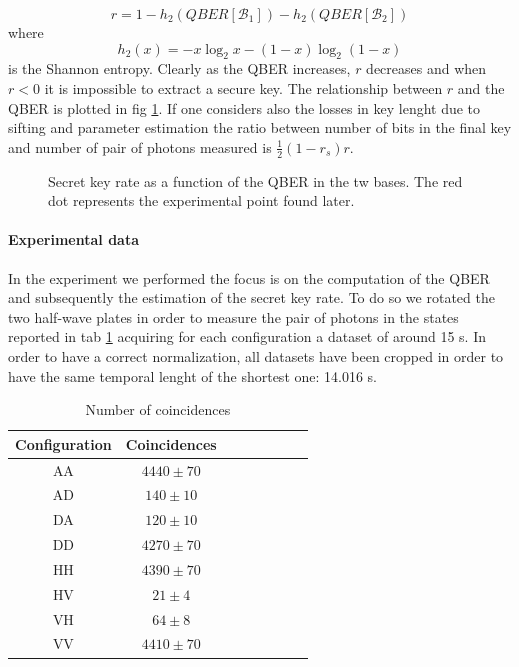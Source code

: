 \documentclass[a4paper, 11pt]{article}
\begin{document}
\begin{enumerate}
      \begin{equation*}
        r = 1 - h_2(QBER[\mathcal{B}_1]) - h_2(QBER[\mathcal{B}_2])
      \end{equation*}
      where
      \begin{equation*}
        h_2(x) = -x\log_2x - (1 - x)\log_2(1 - x)
      \end{equation*}
      is the Shannon entropy.
      Clearly as the QBER increases, $r$ decreases and when $r < 0$ it is impossible to extract a secure key. The relationship between $r$ and the QBER is plotted in fig \ref{fig:r_vs_qber}.
      If one considers also the losses in key lenght due to sifting and parameter estimation the ratio between number of bits in the final key and number of pair of photons measured is $\frac{1}{2} (1 - r_s) r$.
    \end{enumerate}

    \begin{figure}[H]
      \centering
      \caption{Secret key rate as a function of the QBER in the tw bases. The red dot represents the experimental point found later.}
      \label{fig:r_vs_qber}
    \end{figure}

    \paragraph{Experimental data}
      In the experiment we performed the focus is on the computation of the QBER and subsequently the estimation of the secret key rate. To do so we rotated the two half-wave plates in order to measure the pair of photons in the states reported in tab \ref{tab:QKD_coinc} acquiring for each configuration a dataset of around 15 s. In order to have a correct normalization, all datasets have been cropped in order to have the same temporal lenght of the shortest one: 14.016 s.

      \begin{table}[H]
        \centering
        \begin{tabular}{cccccccc}
          \toprule
          Configuration & Coincidences \\
          \midrule
          AA & $4440 \pm 70$ \\
          AD & $140 \pm 10$ \\
          DA & $120 \pm 10$ \\
          DD & $4270 \pm 70$ \\
          \midrule
          HH & $4390 \pm 70$ \\
          HV & $21 \pm 4$ \\
          VH & $64 \pm 8$ \\
          VV & $4410 \pm 70$ \\
          \bottomrule
        \end{tabular}
        \caption{Number of coincidences}
        \label{tab:QKD_coinc}
      \end{table}
\end{document}
